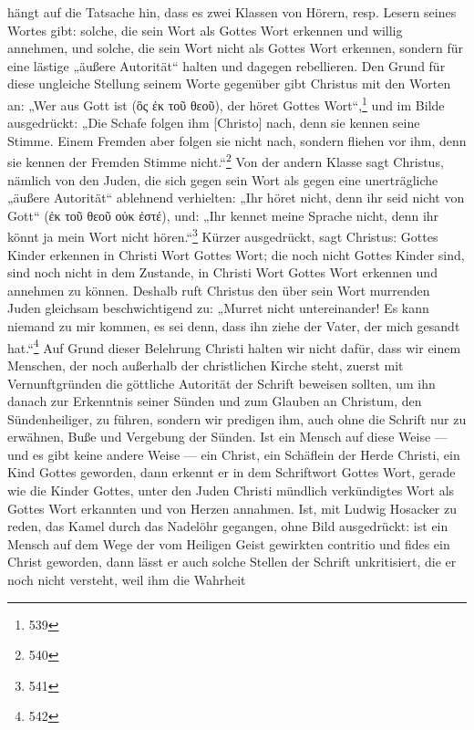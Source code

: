 hängt auf die Tatsache hin, dass es zwei Klassen von Hörern, resp. Lesern seines Wortes gibt: solche, die sein Wort als Gottes Wort erkennen und willig annehmen, und solche, die sein Wort nicht als Gottes Wort erkennen, sondern für eine lästige „äußere Autorität“ halten und dagegen rebellieren. Den Grund für diese ungleiche Stellung seinem Worte gegenüber gibt Christus mit den Worten an: „Wer aus Gott ist (\textgreek{ὃς ἐκ τοῦ θεοῦ}), der höret Gottes Wort“,\footnote{539} und im Bilde ausgedrückt: „Die Schafe folgen ihm [Christo] nach, denn sie kennen seine Stimme. Einem Fremden aber folgen sie nicht nach, sondern fliehen vor ihm, denn sie kennen der Fremden Stimme nicht.“\footnote{540} Von der andern Klasse sagt Christus, nämlich von den Juden, die sich gegen sein Wort als gegen eine unerträgliche „äußere Autorität“ ablehnend verhielten: „Ihr höret nicht, denn ihr seid nicht von Gott“ (\textgreek{ἐκ τοῦ θεοῦ οὐκ ἐστέ}), und: „Ihr kennet meine Sprache nicht, denn ihr könnt ja mein Wort nicht hören.“\footnote{541} Kürzer ausgedrückt, sagt Christus: Gottes Kinder erkennen in Christi Wort Gottes Wort; die noch nicht Gottes Kinder sind, sind noch nicht in dem Zustande, in Christi Wort Gottes Wort erkennen und annehmen zu können. Deshalb ruft Christus den über sein Wort murrenden Juden gleichsam beschwichtigend zu: „Murret nicht untereinander! Es kann niemand zu mir kommen, es sei denn, dass ihn ziehe der Vater, der mich gesandt hat.“\footnote{542} Auf Grund dieser Belehrung Christi halten wir nicht dafür, dass wir einem Menschen, der noch außerhalb der christlichen Kirche steht, zuerst mit Vernunftgründen die göttliche Autorität der Schrift beweisen sollten, um ihn danach zur Erkenntnis seiner Sünden und zum Glauben an Christum, den Sündenheiliger, zu führen, sondern wir predigen ihm, auch ohne die Schrift nur zu erwähnen, Buße und Vergebung der Sünden. Ist ein Mensch auf diese Weise --- und es gibt keine andere Weise --- ein Christ, ein Schäflein der Herde Christi, ein Kind Gottes geworden, dann erkennt er in dem Schriftwort Gottes Wort, gerade wie die Kinder Gottes, unter den Juden Christi mündlich verkündigtes Wort als Gottes Wort erkannten und von Herzen annahmen. Ist, mit Ludwig Hosacker zu reden, das Kamel durch das Nadelöhr gegangen, ohne Bild ausgedrückt: ist ein Mensch auf dem Wege der vom Heiligen Geist gewirkten contritio und fides ein Christ geworden, dann lässt er auch solche Stellen der Schrift unkritisiert, die er noch nicht versteht, weil ihm die Wahrheit